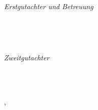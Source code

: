 \begin{titlepage}
	\vfill
	
	\centering
	
	{\large \thesisSubject} \\[5mm]
	{\huge \color{ctcolortitle}\textbf{\thesisTitle} \\[10mm]}
	{\LARGE \thesisName}

	\vfill
	\begin{minipage}[t]{.4\textwidth}
		\raggedleft
		\textit{Erstgutachter und Betreuung}
	\end{minipage}
	\hspace*{15pt}
	\begin{minipage}[t]{.45\textwidth}
		{\Large \thesisFirstReviewer} \\
	\end{minipage} \\[0mm]
	\begin{minipage}[t]{.4\textwidth}
		\raggedleft
		\textit{Zweitgutachter}
	\end{minipage}
	\hspace*{15pt}
	\begin{minipage}[t]{.45\textwidth}
		{\Large \thesisSecondReviewer} \\
	\end{minipage} \\[10mm]

	\thesisAuthorCity, \thesisDate \\

\end{titlepage}


